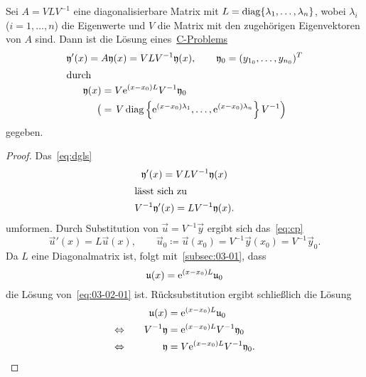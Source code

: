 \begin{theorem}\label{thm:diagbar-cp-solution}
    Sei $A = V L V^{-1}$ eine diagonalisierbare Matrix mit $L = \diag\{\lambda_1,\dots,\lambda_n\}$,
    wobei $\lambda_i$ ($i = 1,\dots,n$) die Eigenwerte und $V$ die Matrix mit den zugehörigen Eigenvektoren von $A$ sind.
    Dann ist die Lösung eines~\hyperref[eq:cp]{C-Problems}
    \begin{gather*}
        \vec{y}'(x) = A \vec{y}(x) = V L V^{-1} \vec{y}(x), \qquad \vec{y}_0 = (y_{1_0},\dots,y_{n_0})^T\\
        \intertext{durch}
        \begin{aligned}
            \vec{y}(x)
            &= V \e^{(x - x_0) L} V^{-1} \vec{y}_0\\
            \big( &= \left. V \diag\left\{\e^{(x - x_0) \lambda_1}, \dots,\e^{(x - x_0) \lambda_n}\right\} V^{-1} \right)
        \end{aligned}
    \end{gather*}
    gegeben.
\end{theorem}

\begin{proof}
    Das~\ref{eq:dgls}
    \begin{gather*}
        \vec{y}'(x) = V L V^{-1} \vec{y}(x)\\
        \intertext{lässt sich zu}
        V^{-1} \vec{y}'(x) = L V^{-1} \vec{y}(x).
    \end{gather*}
    umformen.
    Durch Substitution von $\vec{u} = V^{-1} \vec{y}$ ergibt sich das~\ref{eq:cp}
    \begin{equation}\tag{$\triangle$}\label{eq:03-02-01}
        \vec{u}'(x) = L \vec{u}(x), \qquad \vec{u}_0 \coloneqq \vec{u}(x_0) = V^{-1} \vec{y}(x_0) = V^{-1} \vec{y}_0.
    \end{equation}
    Da $L$ eine Diagonalmatrix ist, folgt mit~\autoref{subsec:03-01}, dass
    \begin{equation*}
        \vec{u}(x) = \e^{(x - x_0) L} \vec{u}_0
    \end{equation*}
    die Lösung von~\eqref{eq:03-02-01} ist.
    Rücksubstitution ergibt schließlich die Lösung
    \begin{alignat*}{2}
                             && \vec{u}(x) &= \e^{(x - x_0) L} \vec{u}_0\\
        \Leftrightarrow\quad && V^{-1} \vec{y} &= \e^{(x - x_0) L} V^{-1} \vec{y}_0\\
        \Leftrightarrow\quad && \vec{y} &= V \e^{(x - x_0) L} V^{-1} \vec{y}_0.
    \end{alignat*}
\end{proof}

